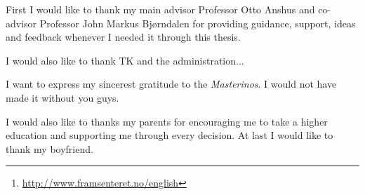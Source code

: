 \documentclass[USenglish]{uit-thesis}
\begin{document}
\begin{abstract}
\glsresetall

The Arctic Tundra in the far northern hemisphere is one of ecosystems that are most affected by the climate changes in the world today. Five Fram Center\footnote{\url{http://www.framsenteret.no/english}} institutions developed a long-term research project called \gls{coat}. Their goal is to create robust observation systems which enable documentation and understanding of climate change impacts on the Arctic tundra ecosystems.


This thesis describes a prototype of a Wireless Sensor Network (\gls{wsn}) system where nodes in the network creates clusters of Observation Units (\glspl{ou}) to accumulate data. The purpose is to fetch and accumulate data observed by \gls{ou}s for further use and to provide for a more flexible and powerful sensor in the \gls{coat} monitoring of the Arctic Tundra.

We describe a system where nodes discover each other through a broadcast range. Together they form clusters. Each cluster elect a Cluster Head (\gls{ch}) which is responsible for sending out a request for gather and accumulate data from the other nodes in the cluster. The \glspl{ch} are rotating to save battery.


\textbf{HIGH/LOW etc... siste del uklart..}

Results show that the system have a stable CPU and memory usage during execution. Experiments also show that the number of receiving packets at \glspl{ch} is lower than sent packets which indicates that the nodes in the system accumulates data when intended.

Main conclusion/insight..

\end{abstract}


\begin{acknowledgement}
First I would like to thank my main advisor Professor Otto Anshus and co-advisor Professor John Markus Bjørndalen for providing guidance, support, ideas and feedback whenever I needed it through this thesis.

I would also like to thank TK and the administration...

I want to express my sincerest gratitude to the \textit{Masterinos}. I would not have made it without you guys. 

I would also like to thanks my parents for encouraging me to take a higher education and supporting me through every decision. At last I would like to thank my boyfriend.

\end{acknowledgement}
\end{document}
